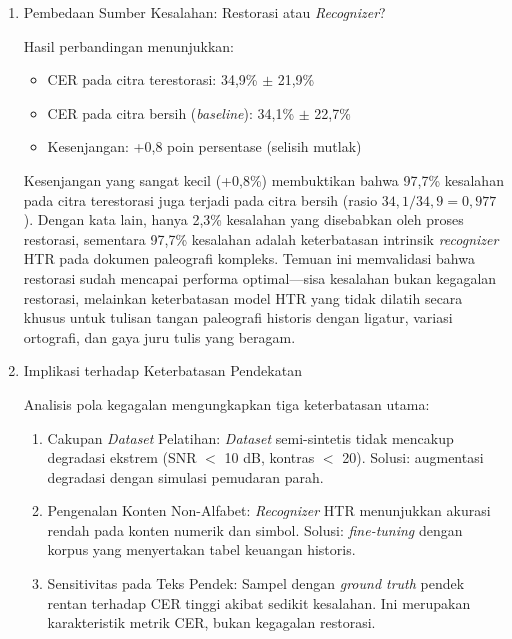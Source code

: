 \begin{enumerate}[leftmargin=1.5em, labelsep=0.5em, itemindent=0pt, label=\arabic*., topsep=0pt, partopsep=0pt]
\item Pembedaan Sumber Kesalahan: Restorasi atau \textit{Recognizer}?

Hasil perbandingan menunjukkan:
\begin{itemize}[leftmargin=1.5em, labelsep=0.5em, itemindent=0pt, noitemsep, topsep=0pt, partopsep=0pt]
    \item CER pada citra terestorasi: 34,9\% $\pm$ 21,9\%
    \item CER pada citra bersih (\textit{baseline}): 34,1\% $\pm$ 22,7\%
    \item Kesenjangan: +0,8 poin persentase (selisih mutlak)
\end{itemize}

Kesenjangan yang sangat kecil (+0,8\%) membuktikan bahwa 97,7\% kesalahan pada citra terestorasi juga terjadi pada citra bersih (rasio $34,1/34,9 = 0,977$). Dengan kata lain, hanya 2,3\% kesalahan yang disebabkan oleh proses restorasi, sementara 97,7\% kesalahan adalah keterbatasan intrinsik \textit{recognizer} HTR pada dokumen paleografi kompleks. Temuan ini memvalidasi bahwa restorasi sudah mencapai performa optimal---sisa kesalahan bukan kegagalan restorasi, melainkan keterbatasan model HTR yang tidak dilatih secara khusus untuk tulisan tangan paleografi historis dengan ligatur, variasi ortografi, dan gaya juru tulis yang beragam.

\item Implikasi terhadap Keterbatasan Pendekatan

Analisis pola kegagalan mengungkapkan tiga keterbatasan utama:
\begin{enumerate}[leftmargin=1.5em, labelsep=0.5em, itemindent=0pt, noitemsep, topsep=0pt, partopsep=0pt, label=\alph*)]
    \item Cakupan \textit{Dataset} Pelatihan: \textit{Dataset} semi-sintetis tidak mencakup degradasi ekstrem (SNR $<$ 10 dB, kontras $<$ 20). Solusi: augmentasi degradasi dengan simulasi pemudaran parah.
    
    \item Pengenalan Konten Non-Alfabet: \textit{Recognizer} HTR menunjukkan akurasi rendah pada konten numerik dan simbol. Solusi: \textit{fine-tuning} dengan korpus yang menyertakan tabel keuangan historis.
    
    \item Sensitivitas pada Teks Pendek: Sampel dengan \textit{ground truth} pendek rentan terhadap CER tinggi akibat sedikit kesalahan. Ini merupakan karakteristik metrik CER, bukan kegagalan restorasi.
\end{enumerate}


\end{enumerate}
